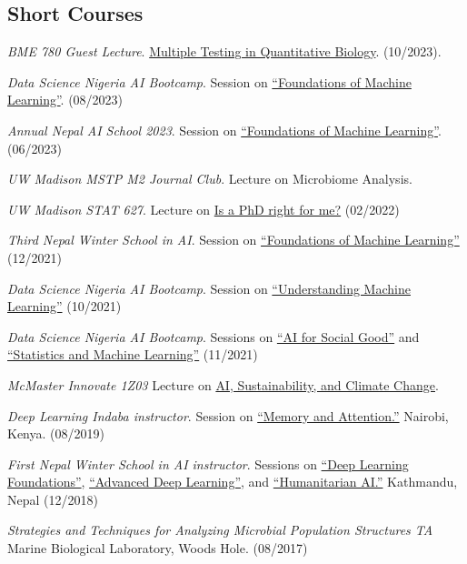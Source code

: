 \documentclass[letterpaper]{article}
\renewenvironment{itemize}{
  \begin{list}{}{
    \setlength{\leftmargin}{1.5em}
  }
}{
  \end{list}
}
\begin{document}
\subsection*{Short Courses}
\begin{itemize}
\item \textit{BME 780 Guest Lecture}. \href{https://krisrs1128.github.io/talks/2023/20231010/20231010.html}{Multiple Testing in Quantitative Biology}. (10/2023).
\item \textit{Data Science Nigeria AI Bootcamp}. Session on \href{http://krisrs1128.github.io/dsn_foundations_2023}{``Foundations of Machine Learning''}. (08/2023)
\item \textit{Annual Nepal AI School 2023}. Session on \href{http://krisrs1128.github.io/naamii_summer_2023}{``Foundations
of Machine Learning''}. (06/2023) 
\item \textit{UW Madison MSTP M2 Journal Club}. Lecture on Microbiome Analysis.
\item \textit{UW Madison STAT 627}. Lecture on \href{https://drive.google.com/file/d/1kq0xJ3XS98igzxFcJOTFUEz2DtoRByCg/view?usp=sharing}{Is a PhD right for me?} (02/2022)
\item \textit{Third Nepal Winter School in AI}. Session on
\href{https://krisrs1128.github.io/winter_school_2021/index.html}{``Foundations
of Machine Learning''} (12/2021)
\item \textit{Data Science Nigeria AI Bootcamp}.
Session on \href{https://drive.google.com/file/d/1bgYQb8z1iCjHyOG1gVWeJJCSPdssndVP/view}{``Understanding Machine Learning''} (10/2021)
\item \textit{Data Science Nigeria AI Bootcamp}.
Sessions on \href{https://www.youtube.com/watch?v=7_8DUN-6tpI&}{``AI for Social Good''} and \href{https://www.youtube.com/watch?v=EefWzpRkIVM}{``Statistics and Machine Learning''} (11/2021)
\item \textit{McMaster Innovate 1Z03} Lecture on
\href{https://docs.google.com/presentation/d/1JWV8_VXYzCzipr6EJZdcdaPY5pz2Cp4F/edit#slide=id.p1}{AI,
Sustainability, and Climate Change}.
\item \textit{Deep Learning Indaba instructor}.
Session on \href{https://www.youtube.com/watch?v=9mWYFZwNpis}{``Memory and Attention.''}
Nairobi, Kenya. (08/2019)
\item \textit{First Nepal Winter School in AI instructor}.
Sessions on \href{https://www.youtube.com/watch?v=3lBMxO2zmGg}{``Deep Learning Foundations''}, \href{https://www.youtube.com/watch?v=OLaX-jmRUwY}{``Advanced Deep Learning''}, and \href{https://www.youtube.com/watch?v=RXZyGwa4TpY}{``Humanitarian AI.''}
Kathmandu, Nepal (12/2018)
\item \textit{Strategies and Techniques for Analyzing Microbial Population Structures TA}
  Marine Biological Laboratory, Woods Hole.
  (08/2017)
\end{itemize}
\end{document}

